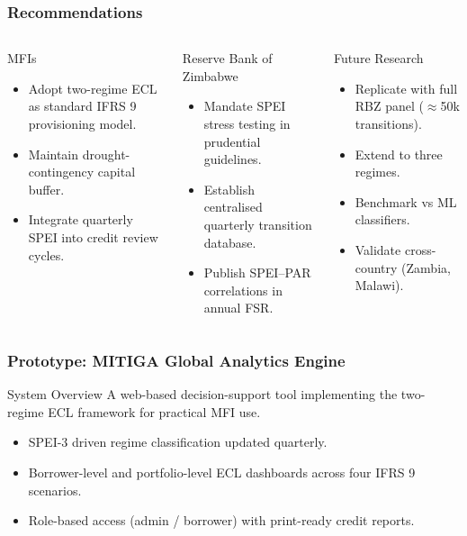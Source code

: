 \documentclass{beamer}
\begin{document}
\begin{frame}
    \frametitle{Recommendations}
    \begin{columns}[T]
    \begin{block}{MFIs}
    \small
    \begin{itemize}
        \item Adopt two-regime ECL as standard IFRS 9 provisioning model.
        \item Maintain drought-contingency capital buffer.
        \item Integrate quarterly SPEI into credit review cycles.
    \end{itemize}
    \end{block}
    \begin{block}{Reserve Bank of Zimbabwe}
    \small
    \begin{itemize}
        \item Mandate SPEI stress testing in prudential guidelines.
        \item Establish centralised quarterly transition database.
        \item Publish SPEI--PAR correlations in annual FSR.
    \end{itemize}
    \end{block}
    \begin{block}{Future Research}
    \small
    \begin{itemize}
        \item Replicate with full RBZ panel ($\approx$50k transitions).
        \item Extend to three regimes.
        \item Benchmark vs ML classifiers.
        \item Validate cross-country (Zambia, Malawi).
    \end{itemize}
    \end{block}
    \end{columns}
\end{frame}

\begin{frame}
    \frametitle{Prototype: MITIGA Global Analytics Engine}
    \begin{block}{System Overview}
        A web-based decision-support tool implementing the two-regime ECL framework for practical MFI use.
    \end{block}
    \vspace{0.5em}
    \begin{itemize}
        \item SPEI-3 driven regime classification updated quarterly.
        \item Borrower-level and portfolio-level ECL dashboards across four IFRS 9 scenarios.
        \item Role-based access (admin / borrower) with print-ready credit reports.
    \end{itemize}
\end{frame}
\end{document}
